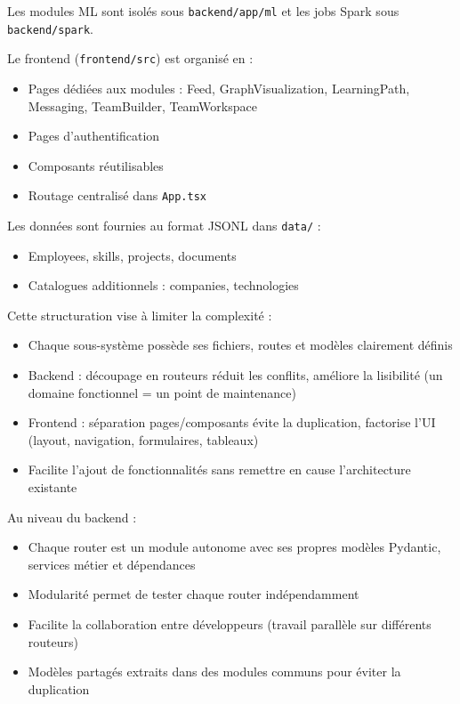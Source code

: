 \documentclass[12pt,a4paper]{report}
\begin{document}
Les modules ML sont isolés sous \texttt{backend/app/ml} et les jobs Spark sous \texttt{backend/spark}.

Le frontend (\texttt{frontend/src}) est organisé en :
\begin{itemize}
  \item Pages dédiées aux modules : Feed, GraphVisualization, LearningPath, Messaging, TeamBuilder, TeamWorkspace
  \item Pages d'authentification
  \item Composants réutilisables
  \item Routage centralisé dans \texttt{App.tsx}
\end{itemize}

Les données sont fournies au format JSONL dans \texttt{data/} :
\begin{itemize}
  \item Employees, skills, projects, documents
  \item Catalogues additionnels : companies, technologies
\end{itemize}

Cette structuration vise à limiter la complexité :
\begin{itemize}
  \item Chaque sous-système possède ses fichiers, routes et modèles clairement définis
  \item Backend : découpage en routeurs réduit les conflits, améliore la lisibilité (un domaine fonctionnel = un point de maintenance)
  \item Frontend : séparation pages/composants évite la duplication, factorise l'UI (layout, navigation, formulaires, tableaux)
  \item Facilite l'ajout de fonctionnalités sans remettre en cause l'architecture existante
\end{itemize}

Au niveau du backend :
\begin{itemize}
  \item Chaque router est un module autonome avec ses propres modèles Pydantic, services métier et dépendances
  \item Modularité permet de tester chaque router indépendamment
  \item Facilite la collaboration entre développeurs (travail parallèle sur différents routeurs)
  \item Modèles partagés extraits dans des modules communs pour éviter la duplication
\end{itemize}
\end{document}
